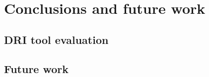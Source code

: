 \chapter{Conclusions and future work}
\label{cha:conclusions}
	\section{DRI tool evaluation}
	\section{Future work}
